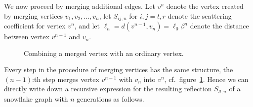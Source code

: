 We now proceed by merging additional edges. Let $v^n$ denote the vertex created by merging vertices $v_1, v_2, \ldots, v_n$, let $S_{ij,n}$ for $i,j=l,r$ denote the scattering coefficient for vertex $v^n$, and let $\ell_n = d(v^{n-1}, v_n) = \ell_0\beta^n$ denote the distance between vertex $v^{n-1}$ and $v_n$.

\begin{figure}[!h]
  \centering
  \caption{Combining a merged vertex with an ordinary vertex.}
  \label{fig: combine vertices 2}
\end{figure}

Every step in the procedure of merging vertices has the same structure, the $(n-1)$:th step merges vertex $v^{n-1}$ with $v_n$ into $v^n$, cf.\ figure~\ref{fig: combine vertices 2}. Hence we can directly write down a recursive expression for the resulting reflection $S_{ll,n}$ of a snowflake graph with $n$ generations as follows.

